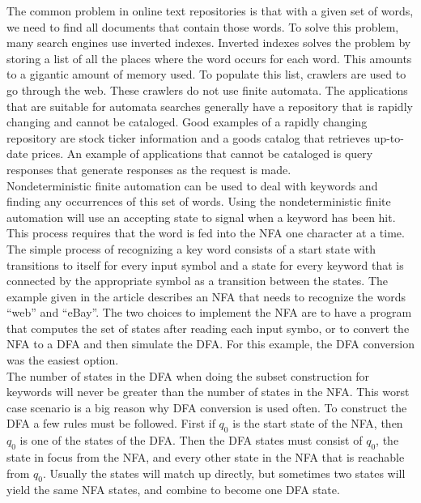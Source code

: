 \documentclass[11pt]{article}
\begin{document}
\begin{spacing}{1.5}
\indent The common problem in online text repositories is that with a given set of words, we need to find all documents
that contain those words. To solve this problem, many search engines use inverted indexes. Inverted indexes solves the
problem by storing a list of all the places where the word occurs for each word. This amounts to a gigantic amount
of memory used. To populate this list, crawlers are used to go through the web. These crawlers do not use finite
automata. The applications that are suitable for automata searches generally have a repository that is rapidly 
changing and cannot be cataloged. Good examples of a rapidly changing repository are stock ticker information and
a goods catalog that retrieves up-to-date prices. An example of applications that cannot be cataloged is query 
responses that generate responses as the request is made. \\
\indent Nondeterministic finite automation can be used to deal with keywords and finding any occurrences of this
set of words. Using the nondeterministic finite automation will use an accepting state to signal when a keyword
has been hit. This process requires that the word is fed into the NFA one character at a time. The simple process
of recognizing a key word consists of a start state with transitions to itself for every input symbol and a state
for every keyword that is connected by the appropriate symbol as a transition between the states. The example given
in the article describes an NFA that needs to recognize the words ``web'' and ``eBay''. The two choices to implement
the NFA are to have a program that computes the set of states after reading each input symbo, or to convert the NFA
to a DFA and then simulate the DFA. For this example, the DFA conversion was the easiest option. \\
\indent The number of states in the DFA when doing the subset construction for keywords will never be greater than
the number of states in the NFA. This worst case scenario is a big reason why DFA conversion is used often. To
construct the DFA a few rules must be followed. First if $q_0$ is the start state of the NFA, then ${q_0}$ is one
of the states of the DFA. Then the DFA states must consist of $q_0$, the state in focus from the NFA, and every
other state in the NFA that is reachable from $q_0$. Usually the states will match up directly, but sometimes two
states will yield the same NFA states, and combine to become one DFA state.
\end{spacing}
\end{document}
